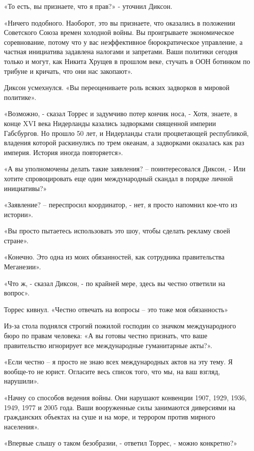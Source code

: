 \documentclass[10pt,final]{book}
\begin{document}
«То есть, вы признаете, что я прав?» - уточнил Диксон.

«Ничего подобного. Наоборот, это вы признаете, что оказались в положении Советского Союза времен холодной войны. Вы проигрываете экономическое соревнование, потому что у вас неэффективное бюрократическое управление, а частная инициатива задавлена налогами и запретами. Ваши политики сегодня только и могут, как Никита Хрущев в прошлом веке, стучать в ООН ботинком по трибуне и кричать, что они нас закопают».

Диксон усмехнулся. «Вы переоцениваете роль всяких задворков в мировой политике».

«Возможно, - сказал Торрес и задумчиво потер кончик носа, - Хотя, знаете, в конце XVI века Нидерланды казались задворками священной империи Габсбургов. Но прошло 50 лет, и Нидерланды стали процветающей республикой, владения которой раскинулись по трем океанам, а задворками оказалась как раз империя. История иногда повторяется».

«А вы уполномочены делать такие заявления? -- поинтересовался Диксон, - Или хотите спровоцировать еще один международный скандал в порядке личной инициативы?»

«Заявление? -- переспросил координатор, - нет, я просто напомнил кое-что из истории».

«Вы просто пытаетесь использовать это шоу, чтобы сделать рекламу своей стране».

«Конечно. Это одна из моих обязанностей, как сотрудника правительства Меганезии».

«Что ж, - сказал Диксон, - по крайней мере, здесь вы честно ответили на вопрос».

Торрес кивнул. «Честно отвечать на вопросы -- это тоже моя обязанность»

Из-за стола поднялся строгий пожилой господин со значком международного бюро по правам человека: «А вы готовы честно признать, что ваше правительство игнорирует все международные гуманитарные акты?».

«Если честно -- я просто не знаю всех международных актов на эту тему. Я вообще-то не юрист. Огласите весь список того, что мы, на ваш взгляд, нарушили».

«Начну со способов ведения войны. Они нарушают конвенции 1907, 1929, 1936, 1949, 1977 и 2005 года. Ваши вооруженные силы занимаются диверсиями на гражданских объектах на суше и на море, и террором против мирного населения».

«Впервые слышу о таком безобразии, - ответил Торрес, - можно конкретно?»
\end{document}
